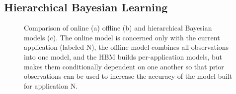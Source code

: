 \subsection{Hierarchical Bayesian Learning}
\label{sec:framework:HBM}

\begin{figure}

  \caption{ Comparison of online (a) offline (b) and hierarchical
    Bayesian models (c). The online model is concerned only with the
    current application (labeled N), the offline model combines all
    observations into one model, and the HBM builds per-application
    models, but makes them conditionally dependent on one another so
    that prior observations can be used to increase the accuracy of
    the model built for application N.}
\label{fig:learning-models}
\end{figure}
